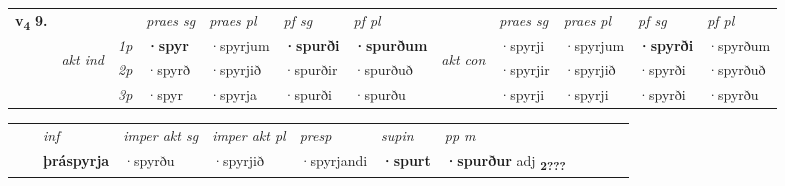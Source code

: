 \begin{tabular}{llllllllllll} \toprule
\multirow{4}{*}{{{\textbf{v{\textsubscript{4}}} \Large{\textbf{9.}}}}}  & &   &  \textit{praes sg}  & \textit{praes pl}  &\textit{ pf sg} & \textit{pf pl} &  &  \textit{praes sg}  & \textit{praes pl}  & \textit{pf sg} & \textit{pf pl } \\*
	\cmidrule{4-7} \cmidrule{9-12}
 & \multirow{3}{*}{\begin{turn}{90}\textit{akt ind}\end{turn}} & {\textit{1p}} & \textbf{·spyr} & ·spyrjum    & \textbf{·spurði} & \textbf{·spurðum} & \multirow{3}{*}{\begin{turn}{90}\textit{akt con}\end{turn}} &·spyrji & ·spyrjum & \textbf{·spyrði} & ·spyrðum\\*
& &  {\textit{2p}} &  ·spyrð  & ·spyrjið   & ·spurðir & ·spurðuð & & ·spyrjir & ·spyrjið & ·spyrði & ·spyrðuð \\*
& &  {\textit{3p}} & ·spyr & ·spyrja   & ·spurði & ·spurðu & & ·spyrji & ·spyrji& ·spyrði & ·spyrðu  \\*
\cmidrule{4-7} \cmidrule{9-12}
\end{tabular}


\begin{tabular}{llllllllllll}
 & & \textit{inf} & \textit{imper akt sg} & \textit{imper akt pl}   & \textit{presp} & \textit{supin}  & \textit{pp m}     \\*
  & & \textbf{þráspyrja} & ·spyrðu  & ·spyrjið   & ·spyrjandi &  \textbf{·spurt}  & \textbf{·spurður} adj \textbf{\textsubscript{2???}} \\*
\cmidrule{1-12}
\end{tabular}



